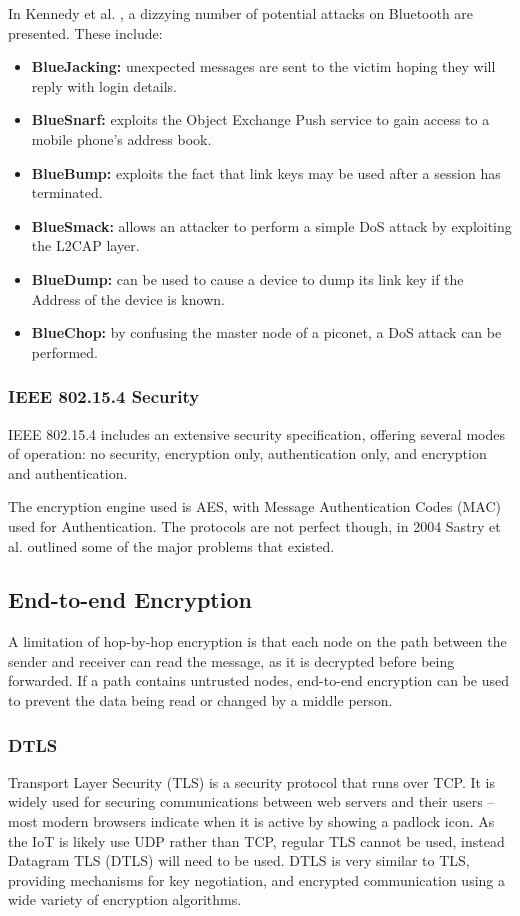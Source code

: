 \documentclass[10pt,journal,compsoc]{IEEEtran}
\begin{document}
In Kennedy et al. \cite{Kennedy2008}, a dizzying number of potential attacks on
Bluetooth are presented. These include: 
\begin{itemize}[$\bullet$]
\item {\bf BlueJacking:} unexpected messages are sent to the victim hoping they
will reply with login details. 
\item {\bf BlueSnarf:} exploits the Object Exchange Push service to gain
access to a mobile phone's address book. 
\item {\bf BlueBump:} exploits the fact that link keys may be used after a session
has terminated. 
\item {\bf BlueSmack:} allows an attacker to perform a simple DoS attack by
exploiting the L2CAP layer.
\item {\bf BlueDump:} can be used to cause a device to dump its link key if the
 Address of the device is known. 
\item {\bf BlueChop:} by confusing the master node of a piconet, a DoS attack can be
performed. 
\end{itemize}

\subsubsection{IEEE 802.15.4 Security}
IEEE 802.15.4 includes an extensive security specification, offering several
modes of operation: no security, encryption only, authentication only, and
encryption and authentication. 

The encryption engine used is AES, with Message Authentication Codes (MAC) used
for Authentication. The protocols are not perfect though, in 2004 Sastry et al.
\cite{Sastry2004} outlined some of the major problems that existed.  


\subsection{End-to-end Encryption}
A limitation of hop-by-hop encryption is that each node on the path between the
sender and receiver can read the message, as it is decrypted before being
forwarded. If a path contains untrusted nodes, end-to-end encryption can be
used to prevent the data being read or changed by a middle person. 

\subsubsection{DTLS}
Transport Layer Security (TLS) is a security protocol that runs over TCP. It is
widely used for securing communications between web servers and their users --
most modern browsers indicate when it is active by showing a padlock icon. As
the IoT is likely use UDP rather than TCP, regular TLS cannot be used, instead
Datagram TLS (DTLS) will need to be used. DTLS is very similar to TLS,
providing mechanisms for key negotiation, and encrypted communication using a
wide variety of encryption algorithms.  
\end{document}
